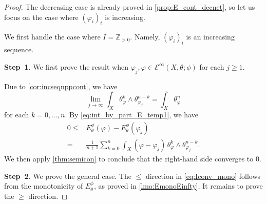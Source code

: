 \begin{proof}
    The decreasing case is already proved in \cref{prop:E_cont_decnet}, so let us focus on the case where $(\varphi_i)_i$ is increasing.

    We first handle the case where $I=\mathbb{Z}_{>0}$. Namely, $(\varphi_i)_i$ is an increasing sequence.

    \textbf{Step~1}. We first prove the result when $\varphi_j,\varphi\in \mathcal{E}^{\infty}(X,\theta;\phi)$ for each $j\geq 1$.

    Due to \cref{cor:incseqnppcont}, we have
    \[
        \lim_{j\to\infty} \int_X \theta_{\varphi}^k\wedge \theta_{\varphi_j}^{n-k}=\int_X \theta_{\varphi}^n
    \]
    for each $k=0,\ldots,n$.
    By \eqref{eq:int_by_part_E_temp1}, we have
    \[
    \begin{aligned}
    0\leq & E_{\theta}^{\phi}(\varphi)-E_{\theta}^{\phi}(\varphi_j)\\
    =& \frac{1}{n+1}\sum_{k=0}^n \int_X(\varphi-\varphi_j)\,\theta_{\varphi}^k\wedge \theta_{\varphi_j}^{n-k}.
    \end{aligned}
    \]
    We then apply \cref{thm:semicon} to conclude that the right-hand side converges to $0$.

    \textbf{Step~2}. We prove the general case. The $\leq$ direction in \eqref{eq:Iconv_mono} follows from the monotonicity of $E_{\theta}^{\phi}$, as proved in \cref{lma:EmonoEinfty}. It remains to prove the $\geq$ direction.


\end{proof}
